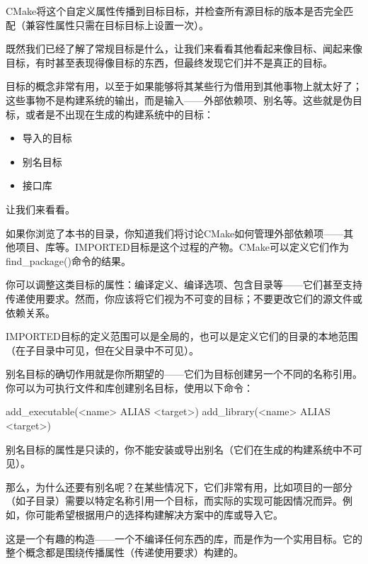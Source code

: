 CMake将这个自定义属性传播到目标目标，并检查所有源目标的版本是否完全匹配（兼容性属性只需在目标目标上设置一次）。

既然我们已经了解了常规目标是什么，让我们来看看其他看起来像目标、闻起来像目标，有时甚至表现得像目标的东西，但最终发现它们并不是真正的目标。


目标的概念非常有用，以至于如果能够将其某些行为借用到其他事物上就太好了；这些事物不是构建系统的输出，而是输入——外部依赖项、别名等。这些就是伪目标，或者是不出现在生成的构建系统中的目标：

\begin{itemize}
\item
导入的目标

\item
别名目标

\item
接口库
\end{itemize}

让我们来看看。


如果你浏览了本书的目录，你知道我们将讨论CMake如何管理外部依赖项——其他项目、库等。IMPORTED目标是这个过程的产物。CMake可以定义它们作为find\_package()命令的结果。

你可以调整这类目标的属性：编译定义、编译选项、包含目录等——它们甚至支持传递使用要求。然而，你应该将它们视为不可变的目标；不要更改它们的源文件或依赖关系。

IMPORTED目标的定义范围可以是全局的，也可以是定义它们的目录的本地范围（在子目录中可见，但在父目录中不可见）。


别名目标的确切作用就是你所期望的——它们为目标创建另一个不同的名称引用。你可以为可执行文件和库创建别名目标，使用以下命令：

\begin{shell}
add_executable(<name> ALIAS <target>)
add_library(<name> ALIAS <target>)
\end{shell}

别名目标的属性是只读的，你不能安装或导出别名（它们在生成的构建系统中不可见）。

那么，为什么还要有别名呢？在某些情况下，它们非常有用，比如项目的一部分（如子目录）需要以特定名称引用一个目标，而实际的实现可能因情况而异。例如，你可能希望根据用户的选择构建解决方案中的库或导入它。


这是一个有趣的构造——一个不编译任何东西的库，而是作为一个实用目标。它的整个概念都是围绕传播属性（传递使用要求）构建的。

